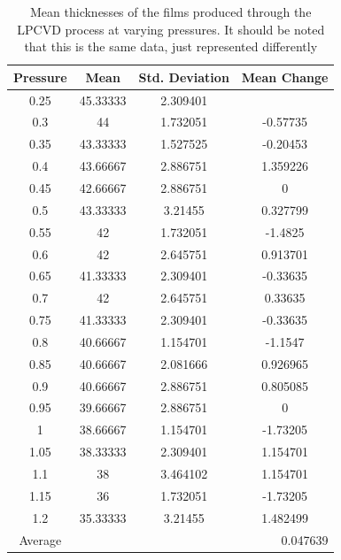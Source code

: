 \documentclass[letterpaper]{article}
\begin{document}
\begin{table}[H]
 \centering
 \begin{tabular}{|c|c|c|c|}
  \hline
  Pressure & Mean                          & Std. Deviation & Mean Change \\ \hline
  0.25     & 45.33333                      & 2.309401       &             \\ \hline
  0.3      & 44                            & 1.732051       & -0.57735    \\ \hline
  0.35     & 43.33333                      & 1.527525       & -0.20453    \\ \hline
  0.4      & 43.66667                      & 2.886751       & 1.359226    \\ \hline
  0.45     & 42.66667                      & 2.886751       & 0           \\ \hline
  0.5      & 43.33333                      & 3.21455        & 0.327799    \\ \hline
  0.55     & 42                            & 1.732051       & -1.4825     \\ \hline
  0.6      & 42                            & 2.645751       & 0.913701    \\ \hline
  0.65     & 41.33333                      & 2.309401       & -0.33635    \\ \hline
  0.7      & 42                            & 2.645751       & 0.33635     \\ \hline
  0.75     & 41.33333                      & 2.309401       & -0.33635    \\ \hline
  0.8      & 40.66667                      & 1.154701       & -1.1547     \\ \hline
  0.85     & 40.66667                      & 2.081666       & 0.926965    \\ \hline
  0.9      & 40.66667                      & 2.886751       & 0.805085    \\ \hline
  0.95     & 39.66667                      & 2.886751       & 0           \\ \hline
  1        & 38.66667                      & 1.154701       & -1.73205    \\ \hline
  1.05     & 38.33333                      & 2.309401       & 1.154701    \\ \hline
  1.1      & 38                            & 3.464102       & 1.154701    \\ \hline
  1.15     & 36                            & 1.732051       & -1.73205    \\ \hline
  1.2      & 35.33333                      & 3.21455        & 1.482499    \\ \hline
  Average  & \multicolumn{3}{r|}{0.047639}                                \\ \hline
 \end{tabular}
 \caption{Mean thicknesses of the films produced through the LPCVD process at varying pressures. It should be noted that this is the same data, just represented differently}
 \label{pressurestat}
\end{table}
\end{document}
